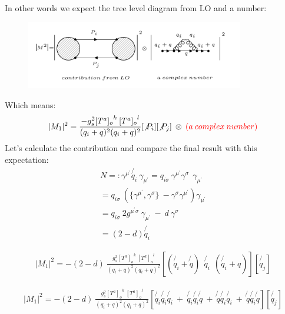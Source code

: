 In other words we expect the tree level diagram from LO and a number:
\begin{figure}[h!]
\centering
\includegraphics[width=0.85\textwidth]{images/expectationqg-qbar.png}
\end{figure}
Which means:\\
\begin{equation}
\begin{split}
|M_1|^2=\frac{-g_s^2  {[T^a]_{o}}^k \: {[T^a]_o}^l }{(q_i + q)^2 (q_i + q)^2}
[\not{P_i}]
[\not{P_j}]\:\otimes \: {\color[RGB]{255,0,0} (a\: complex\: number)}
\end{split}
\end{equation}  
Let's calculate the contribution and compare the final result with this expectation:
\begin{equation}
\begin{split}
N=: \gamma^{{\mu}^{\prime}} \not{q_i} \: \gamma_{{\mu}^{\prime}} = {q_{i\sigma}} \: \gamma^{{\mu}^{\prime}} \gamma^{\sigma} \:\: \gamma_{{\mu}^{\prime}}\\
={q_{i\sigma}} \: (\lbrace{\gamma^{{\mu}^{\prime}}}, {\gamma^{\sigma}}\rbrace \: - {\gamma^{\sigma}}{\gamma^{{\mu}^{\prime}}})\gamma_{{\mu}^{\prime}}\\
={q_{i\sigma}} \: 2g^{{{\mu}^{\prime}}{\sigma}} \: \gamma_{{\mu}^{\prime}} \: - \:d\:{\gamma^{\sigma}}\\
=(2-d) \not{q_i}
\end{split}
\end{equation}

\begin{equation}
\begin{split}
|M_1|^2=-(2-d)\:\frac{g_s^2  {[T^a]_{o}}^k \: {[T^a]_o}^l }{(q_i + q)^2 (q_i + q)^2}
[(\not{q_i} + \not{q}) \:
 \:\not{q_i} \: 
 \: (\not{q_i} + q)]
[\not{q_j}]
\end{split}
\end{equation}

\begin{equation}
\begin{split}
|M_1|^2=-(2-d)\:\frac{g_s^2  {[T^a]_{o}}^k \: {[T^a]_o}^l }{(q_i + q)^2 (q_i + q)^2}
[\not{q_i} \not{q_i} \not{q_i} \: + \: \not{q_i} \not{q_i} \not{q} \: + \: \not{q} \not{q_i} \not{q_i} \:+\: \not{q} \not{q_i} \not{q}]
[\not{q_j}]
\end{split}
\end{equation}

